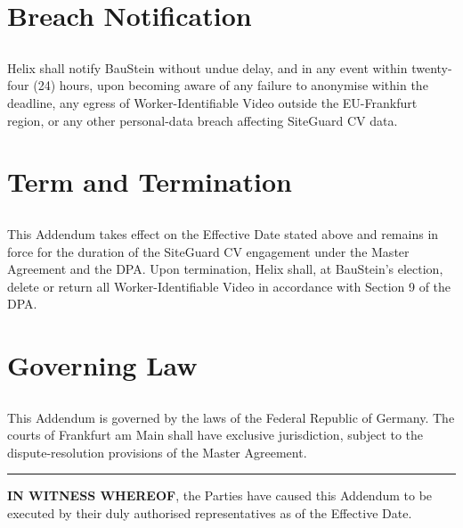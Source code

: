 \documentclass[11pt]{article}
\begin{document}
\section{Breach Notification}

\subsection{} Helix shall notify BauStein without undue delay, and in any event within twenty-four (24) hours, upon becoming aware of any failure to anonymise within the deadline, any egress of Worker-Identifiable Video outside the EU-Frankfurt region, or any other personal-data breach affecting SiteGuard CV data.

\section{Term and Termination}

\subsection{} This Addendum takes effect on the Effective Date stated above and remains in force for the duration of the SiteGuard CV engagement under the Master Agreement and the DPA. Upon termination, Helix shall, at BauStein's election, delete or return all Worker-Identifiable Video in accordance with Section 9 of the DPA.

\section{Governing Law}

\subsection{} This Addendum is governed by the laws of the Federal Republic of Germany. The courts of Frankfurt am Main shall have exclusive jurisdiction, subject to the dispute-resolution provisions of the Master Agreement.

\vspace{2em}
\hrule
\vspace{1em}

\textbf{IN WITNESS WHEREOF}, the Parties have caused this Addendum to be executed by their duly authorised representatives as of the Effective Date.

\vspace{2.5em}
\end{document}
